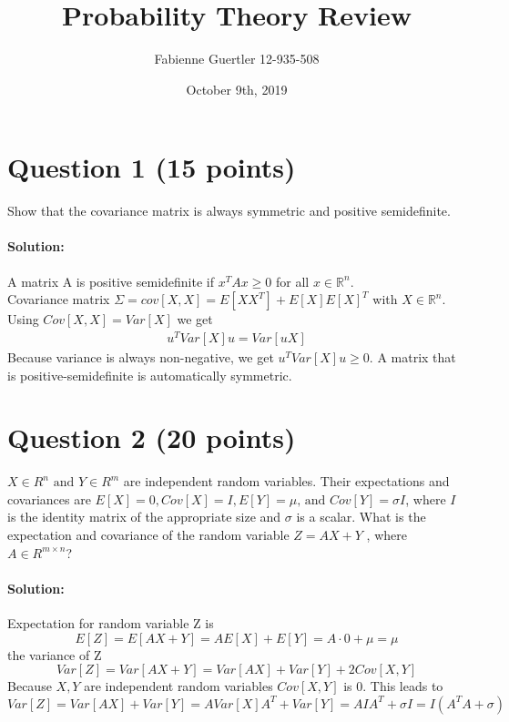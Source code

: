 \documentclass[
	10pt, %
]{../fphw}
\title{Probability Theory Review} %
\author{Fabienne Guertler 12-935-508} %
\date{October 9th, 2019} %
\institute{University of Bern} %
\begin{document}
	\maketitle
	\section*{Question 1 (15 points)}
	\begin{problem}
		Show that the covariance matrix is always symmetric and positive semidefinite.
	\end{problem}
	\paragraph{Solution:} A matrix A is positive semidefinite if $x^TAx \ge 0$ for all $x\in\mathbb{R}^n$.\\
	Covariance matrix $\Sigma = cov[X,X] = E[XX^T] + E[X]E[X]^T$ with $X\in\mathbb{R}^n$. Using $Cov[X,X] = Var[X]$ we get
	\begin{align*}
		u^TVar[X]u = Var[uX] 
	\end{align*}
	Because variance is always non-negative, we get $u^TVar[X]u \ge 0$.
	A matrix that is positive-semidefinite is automatically symmetric.
	
	\section*{Question 2 (20 points)}
	\begin{problem}
		$X\in R^n\text{ and }Y\in R^m$ are independent random variables. Their expectations and covariances are $E[X] = 0, Cov[X] = I, E[Y] = \mu\text{, and } Cov[Y]=\sigma I$, where $I$ is the identity matrix of the appropriate size and $\sigma$ is a scalar. What is the expectation and covariance of the random variable $Z = AX + Y$ , where $A\in R^{m\times n}$?
	\end{problem}
	\paragraph{Solution:} Expectation for random variable Z is
	\begin{equation*}
		E[Z] = E[AX+Y] = AE[X]+E[Y] = A\cdot 0 + \mu = \mu
	\end{equation*}
	the variance of Z
	\begin{equation*}
		Var[Z] = Var[AX+Y] = Var[AX] + Var[Y] + 2Cov[X,Y]
	\end{equation*}
	Because $X,Y$ are independent random variables $Cov[X,Y]$ is 0. This leads to
	\begin{equation*}
		Var[Z] = Var[AX] + Var[Y] = AVar[X]A^T + Var[Y] = AIA^T + \sigma I = I(A^TA + \sigma)
	\end{equation*}
\end{document}
